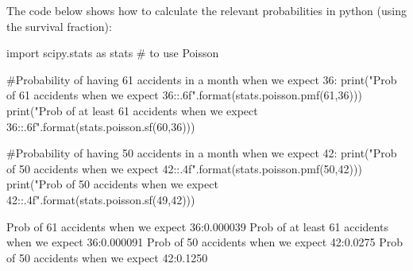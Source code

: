 \begin{example}
The code below shows how to calculate the relevant probabilities in python (using the survival fraction):
\begin{python}[caption = Computing Poisson probability of null hypothesis] 
import scipy.stats as stats # to use Poisson

#Probability of having 61 accidents in a month when we expect 36:
print("Prob of 61 accidents when we expect 36:{:.6f}".format(stats.poisson.pmf(61,36)))
print("Prob of at least 61 accidents when we expect 36:{:.6f}".format(stats.poisson.sf(60,36)))

#Probability of having 50 accidents in a month when we expect 42:
print("Prob of 50 accidents when we expect 42:{:.4f}".format(stats.poisson.pmf(50,42)))
print("Prob of 50 accidents when we expect 42:{:.4f}".format(stats.poisson.sf(49,42)))
\end{python}
\begin{poutput}
Prob of 61 accidents when we expect 36:0.000039
Prob of at least 61 accidents when we expect 36:0.000091
Prob of 50 accidents when we expect 42:0.0275
Prob of 50 accidents when we expect 42:0.1250
\end{poutput}
\end{example}


